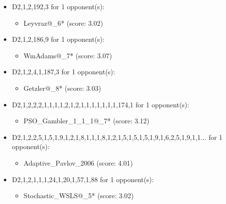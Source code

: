 \begin{appendices}
\begin{itemize}
    \item D2,1,2,192,3 for 1 opponent(s):
    \begin{multicols}{3}
         \begin{itemize}
            \item Leyvraz@\_6* (score: 3.02)
        \end{itemize}
     \end{multicols}
     
    \item D2,1,2,186,9 for 1 opponent(s):
    \begin{multicols}{3}
         \begin{itemize}
            \item WmAdams@\_7* (score: 3.07)
        \end{itemize}
     \end{multicols}
     
    \item D2,1,2,4,1,187,3 for 1 opponent(s):
    \begin{multicols}{3}
         \begin{itemize}
            \item Getzler@\_8* (score: 3.03)
        \end{itemize}
     \end{multicols}
     
    \item D2,1,2,2,2,1,1,1,1,2,1,2,1,1,1,1,1,1,1,174,1 for 1 opponent(s):
    \begin{multicols}{3}
         \begin{itemize}
            \item PSO\_Gambler\_1\_1\_1@\_7* (score: 3.12)
        \end{itemize}
     \end{multicols}
     
    \item D2,1,2,2,5,1,5,1,9,1,2,1,8,1,1,1,8,1,2,1,5,1,5,1,5,1,9,1,6,2,5,1,9,1,1... for 1 opponent(s):
    \begin{multicols}{3}
         \begin{itemize}
            \item Adaptive\_Pavlov\_2006 (score: 4.01)
        \end{itemize}
     \end{multicols}
     
    \item D2,1,2,1,1,1,24,1,20,1,57,1,88 for 1 opponent(s):
    \begin{multicols}{3}
         \begin{itemize}
            \item Stochastic\_WSLS@\_5* (score: 3.02)
        \end{itemize}
     \end{multicols}
     

\end{itemize}
\end{appendices}
